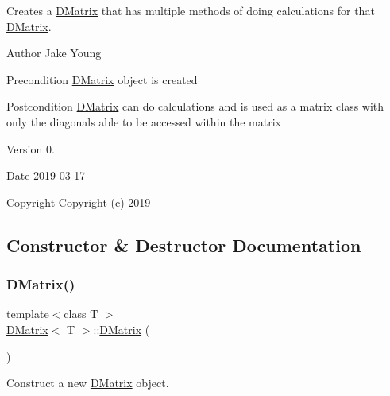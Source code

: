 Creates a \mbox{\hyperlink{class_d_matrix}{D\+Matrix}} that has multiple methods of doing calculations for that \mbox{\hyperlink{class_d_matrix}{D\+Matrix}}. 

\begin{DoxyAuthor}{Author}
Jake Young 
\end{DoxyAuthor}
\begin{DoxyPrecond}{Precondition}
\mbox{\hyperlink{class_d_matrix}{D\+Matrix}} object is created 
\end{DoxyPrecond}
\begin{DoxyPostcond}{Postcondition}
\mbox{\hyperlink{class_d_matrix}{D\+Matrix}} can do calculations and is used as a matrix class with only the diagonals able to be accessed within the matrix 
\end{DoxyPostcond}
\begin{DoxyVersion}{Version}
0. 
\end{DoxyVersion}
\begin{DoxyDate}{Date}
2019-\/03-\/17
\end{DoxyDate}
\begin{DoxyCopyright}{Copyright}
Copyright (c) 2019 
\end{DoxyCopyright}


\subsection{Constructor \& Destructor Documentation}
\mbox{\label{class_d_matrix_a92089f0346240ccd1bf6ac6888e51f75}} 
\subsubsection{\texorpdfstring{DMatrix()}{DMatrix()}\hspace{0.1cm}{\footnotesize\ttfamily [1/5]}}
{\footnotesize\ttfamily template$<$class T $>$ \\
\mbox{\hyperlink{class_d_matrix}{D\+Matrix}}$<$ T $>$\+::\mbox{\hyperlink{class_d_matrix}{D\+Matrix}} (\begin{DoxyParamCaption}{ }\end{DoxyParamCaption})}



Construct a new \mbox{\hyperlink{class_d_matrix}{D\+Matrix}} object. 

\mbox{\label{class_d_matrix_a002c3303de571ec5f18e7da699a209a2}} 
